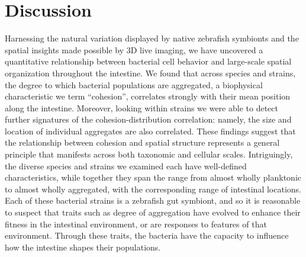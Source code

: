 {%




 \section{Discussion}	

Harnessing the natural variation displayed by native zebrafish symbionts and the spatial insights made possible by 3D live imaging, we have uncovered a quantitative relationship between bacterial cell behavior and large-scale spatial organization throughout the intestine. We found that across species and strains, the degree to which bacterial populations are aggregated, a biophysical characteristic we term ``cohesion'', correlates strongly with their mean position along the intestine. Moreover, looking within strains we were able to detect further signatures of the cohesion-distribution correlation: namely, the size and location of individual aggregates are also correlated. These findings suggest that the relationship between cohesion and spatial structure represents a general principle that manifests across both taxonomic and cellular scales. Intriguingly, the diverse species and strains we examined each have well-defined characteristics, while together they span the range from almost wholly planktonic to almost wholly aggregated, with the corresponding range of intestinal locations. Each of these bacterial strains is a zebrafish gut symbiont, and so it is reasonable to suspect that traits such as degree of aggregation have evolved to enhance their fitness in the intestinal environment, or are responses to features of that environment. Through these traits, the bacteria have the capacity to influence how the intestine shapes their populations.

}
